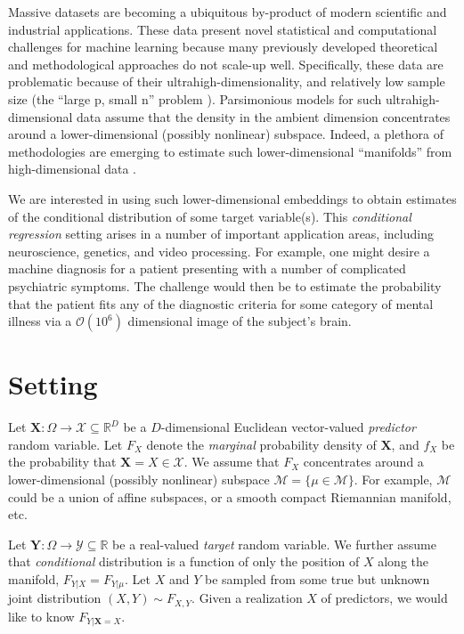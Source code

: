 \documentclass{article}
\newcommand{\mbX}{\mathbf{X}}
\newcommand{\mbY}{\mathbf{Y}}
\newcommand{\Real}{\mathbb{R}}
\providecommand{\mc}[1]{\mathcal{#1}}
\newcommand{\from}{{\ensuremath{\colon}}}           %
\begin{document}
Massive datasets are becoming a ubiquitous by-product of modern scientific and industrial applications. These data present novel statistical and computational challenges for machine learning because many previously developed theoretical and methodological approaches do not scale-up well.  Specifically, these data are problematic because of their ultrahigh-dimensionality, and relatively low sample size (the ``large p, small n'' problem \cite{West}).
Parsimonious models for such ultrahigh-dimensional data assume that the density in the ambient dimension concentrates around a lower-dimensional (possibly nonlinear) subspace.  Indeed, a plethora of methodologies are emerging to estimate such lower-dimensional ``manifolds'' from high-dimensional data \cite{??}.  

We are interested in using such lower-dimensional embeddings to obtain estimates of the conditional distribution of some target variable(s).  This \emph{conditional regression} setting arises in a number of important application areas, including neuroscience, genetics, and video processing.  For example, one might desire a machine diagnosis for a patient presenting with a number of complicated psychiatric symptoms.   The challenge would then be to estimate the probability that the patient fits any of the diagnostic criteria for some category of mental illness via a $\mathcal{O}(10^6)$ dimensional image of the subject's brain. 


\section{Setting} %
\label{sec:setting}

Let $\mbX \from \Omega \to \mathcal{X} \subseteq \Real^D$ be a $D$-dimensional Euclidean vector-valued \emph{predictor} random variable.  Let $F_X$ denote the \emph{marginal} probability density of $\mbX$, and $f_X$ be the probability that  $\mbX=X \in \mc{X}$.  We assume that $F_X$ concentrates around a lower-dimensional (possibly nonlinear) subspace $\mc{M}=\{\mu \in \mc{M}\}$.  For example, $\mc{M}$ could be a union of affine subspaces, or a smooth compact Riemannian manifold, etc.  

Let $\mbY \from \Omega \to  \mathcal{Y} \subseteq \Real$ be a real-valued \emph{target} random variable. We further assume that \emph{conditional} distribution is a function of only the position of $X$ along the manifold, $F_{Y|X}=F_{Y|\mu}$. Let $X$ and $Y$ be sampled from some true but unknown joint distribution $(X,Y) \sim F_{X,Y}$.  Given a realization $X$ of predictors, we would like to know $F_{Y| \mbX=X}$.  
\end{document}
